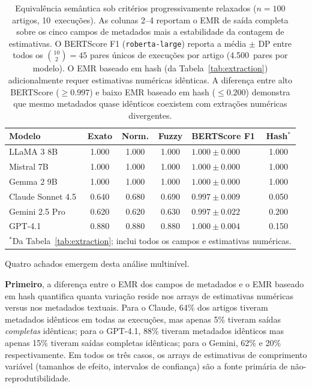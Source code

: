 \documentclass[12pt, a4paper]{article}
\begin{document}
\begin{table}[H]
\centering
\caption{Equivalência semântica sob critérios progressivamente relaxados ($n\!=\!100$ artigos, 10~execuções). As colunas 2--4 reportam o EMR de saída completa sobre os cinco campos de metadados mais a estabilidade da contagem de estimativas. O BERTScore F1 (\texttt{roberta-large}) reporta a média $\pm$ DP entre todos os $\binom{10}{2}{=}45$ pares únicos de execuções por artigo (4.500~pares por modelo). O EMR baseado em hash (da Tabela~\ref{tab:extraction}) adicionalmente requer estimativas numéricas idênticas. A diferença entre alto BERTScore (${\geq}0.997$) e baixo EMR baseado em hash (${\leq}0.200$) demonstra que mesmo metadados quase idênticos coexistem com extrações numéricas divergentes.}
\label{tab:semantic}
\begin{tabular}{lccclc}
\toprule
\textbf{Modelo} & \textbf{Exato} & \textbf{Norm.} & \textbf{Fuzzy} & \textbf{BERTScore F1} & \textbf{Hash}$^{*}$ \\
\midrule
LLaMA 3 8B       & 1.000 & 1.000 & 1.000 & $1.000 \pm 0.000$ & 1.000 \\
Mistral 7B        & 1.000 & 1.000 & 1.000 & $1.000 \pm 0.000$ & 1.000 \\
Gemma 2 9B        & 1.000 & 1.000 & 1.000 & $1.000 \pm 0.000$ & 1.000 \\
\midrule
Claude Sonnet 4.5 & 0.640 & 0.680 & 0.690 & $0.997 \pm 0.009$ & 0.050 \\
Gemini 2.5 Pro    & 0.620 & 0.620 & 0.630 & $0.997 \pm 0.022$ & 0.200 \\
GPT-4.1           & 0.880 & 0.880 & 0.880 & $1.000 \pm 0.004$ & 0.150 \\
\bottomrule
\multicolumn{6}{l}{\footnotesize $^{*}$Da Tabela~\ref{tab:extraction}; inclui todos os campos e estimativas numéricas.}
\end{tabular}
\end{table}

\noindent Quatro achados emergem desta análise multinível.

\textbf{Primeiro}, a diferença entre o EMR dos campos de metadados e o EMR baseado em hash quantifica quanta variação reside nos arrays de estimativas numéricas versus nos metadados textuais.
Para o Claude, 64\% dos artigos tiveram metadados idênticos em todas as execuções, mas apenas 5\% tiveram saídas \emph{completas} idênticas; para o GPT-4.1, 88\% tiveram metadados idênticos mas apenas 15\% tiveram saídas completas idênticas; para o Gemini, 62\% e 20\% respectivamente.
Em todos os três casos, os arrays de estimativas de comprimento variável (tamanhos de efeito, intervalos de confiança) são a fonte primária de não-reprodutibilidade.
\end{document}
